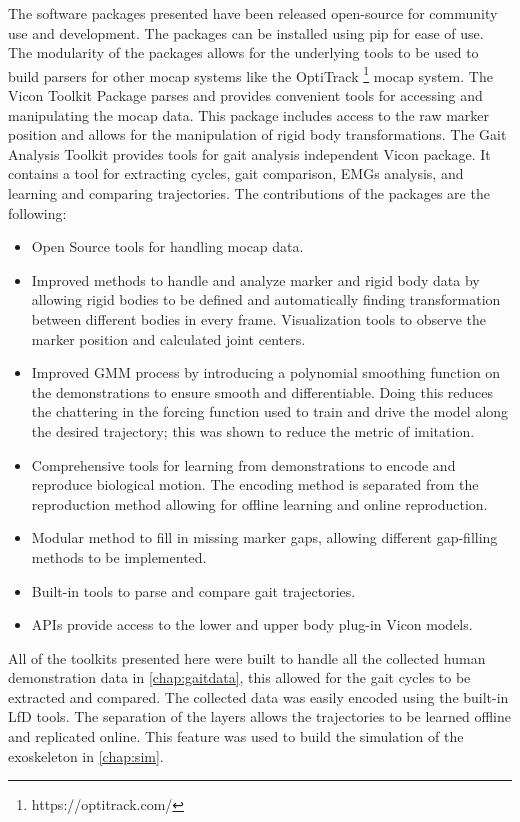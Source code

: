 The software packages presented have been released open-source for community use and development. The packages can be installed using pip for ease of use. The modularity of the packages allows for the underlying tools to be used to build parsers for other mocap systems like the OptiTrack \footnote{https://optitrack.com/} mocap system. The Vicon Toolkit Package parses and provides convenient tools for accessing and manipulating the mocap data. This package includes access to the raw marker position and allows for the manipulation of rigid body transformations. The Gait Analysis Toolkit provides tools for gait analysis independent Vicon package. It contains a tool for extracting cycles, gait comparison, EMGs analysis, and learning and comparing trajectories. The contributions of the packages are the following:

\begin{itemize}
    \item Open Source tools for handling mocap data.
    \item Improved methods to handle and analyze marker and rigid body data by allowing rigid bodies to be defined and automatically finding transformation between different bodies in every frame.
    \iten Visualization tools to observe the marker position and calculated joint centers. 
    \item Improved GMM process by introducing a polynomial smoothing function on the demonstrations to ensure smooth and differentiable. Doing this reduces the chattering in the forcing function used to train and drive the model along the desired trajectory; this was shown to reduce the metric of imitation.
    \item Comprehensive tools for learning from demonstrations to encode and reproduce biological motion. The encoding method is separated from the reproduction method allowing for offline learning and online reproduction.
    \item Modular method to fill in missing marker gaps, allowing different gap-filling methods to be implemented. 
    \item Built-in tools to parse and compare gait trajectories. 
    \item APIs provide access to the lower and upper body plug-in Vicon models. 
\end{itemize}

All of the toolkits presented here were built to handle all the collected human demonstration data in \autoref{chap:gaitdata}, this allowed for the gait cycles to be extracted and compared. The collected data was easily encoded using the built-in LfD tools. The separation of the layers allows the trajectories to be learned offline and replicated online. This feature was used to build the simulation of the exoskeleton in \autoref{chap:sim}.

